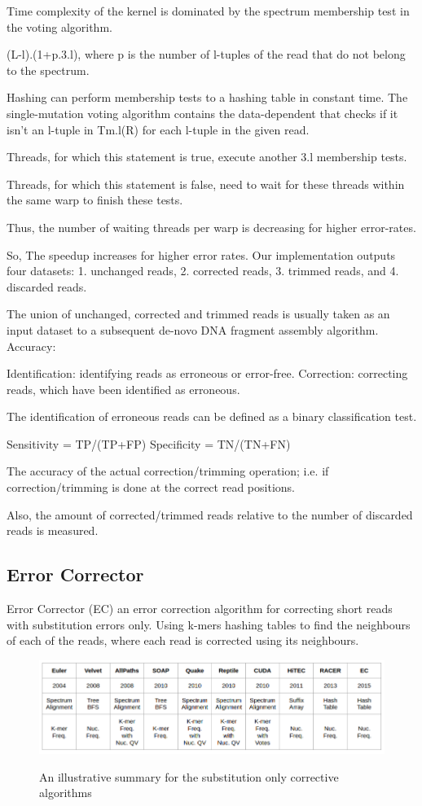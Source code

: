 \documentclass{llncs}
\begin{document}
Time complexity of the kernel is dominated by the spectrum membership test in  the voting algorithm.

(L-l).(1+p.3.l), where p is the number of l-tuples of the read that do not belong to the spectrum. 

Hashing can perform membership tests to a hashing table in constant time. 
         The single-mutation voting algorithm contains the data-dependent that checks if it isn't an l-tuple in Tm.l(R) for each l-tuple in the given read.

Threads, for which this statement is true, execute another 3.l membership tests.

Threads, for which this statement is false, need to wait for these threads within the same warp to finish these tests.
  
Thus, the number of waiting threads per warp is decreasing for higher error-rates.

So, The speedup increases for higher error rates.
Our implementation outputs four datasets:
1. unchanged reads, 
2. corrected reads, 
3. trimmed reads, and
4. discarded reads. 

The union of unchanged, corrected and trimmed reads is usually taken as an input dataset to a subsequent de-novo DNA fragment assembly algorithm. 
Accuracy:

Identification: identifying reads as erroneous or error-free.
Correction: correcting reads, which have been identified as erroneous.

The identification of erroneous reads can be defined as a binary classification test.

Sensitivity = TP/(TP+FP)
Specificity = TN/(TN+FN)

The accuracy of the actual correction/trimming operation; i.e. if correction/trimming is done at the correct read positions.

Also, the amount of corrected/trimmed reads relative to the number of discarded reads is measured. 
\subsection{Error Corrector}
Error Corrector (EC) \cite{EC} an error correction algorithm for correcting short reads with substitution errors only. Using k-mers hashing tables to find the neighbours of each of the reads, where each read is corrected using its neighbours.

\begin{figure}
	\centering
	\includegraphics[width=.951\linewidth]{./figs/RW-1}
	\label{fig:fig12}
	\caption[caption]{An illustrative summary for the substitution only corrective algorithms}
\end{figure}
\end{document}
